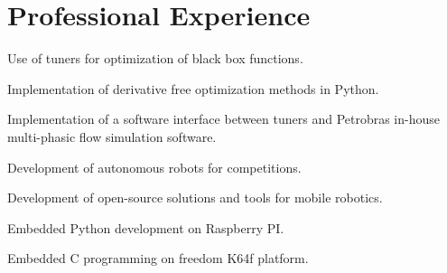 \documentclass[A4]{deedy-resume} %
\begin{document}
\begin{minipage}[t]{0.66\textwidth} %



\section{Professional Experience}

\vspace{\topsep} %
\vspace{\topsep} %
\begin{tightitemize}
 \item Use of tuners for optimization of black box functions.
 \item Implementation of derivative free optimization methods in Python.
 \item Implementation of a software interface between tuners and Petrobras in-house multi-phasic flow simulation software.

\end{tightitemize}
\sectionspace %


\vspace{\topsep} %
\begin{tightitemize}
 \item Development of autonomous robots for competitions.
 \item Development of open-source solutions and tools for mobile robotics.
\end{tightitemize}

\sectionspace %

\vspace{\topsep} %
\begin{tightitemize}
 \item Embedded Python development on Raspberry PI.
 \item Embedded C programming on freedom K64f platform.
\end{tightitemize}




\end{minipage}
\end{document}

